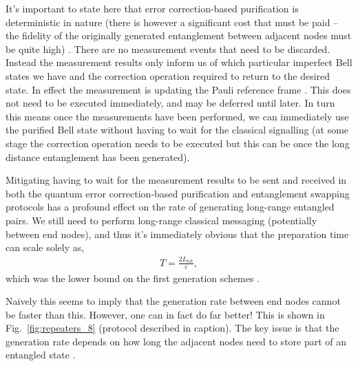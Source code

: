 \documentclass[twocolumn, aps, rmp, amsmath, amssymb, nofootinbib, superscriptaddress, longbibliography, floatfix, table-of-contents, eqsecnum]{revtex4-1}
\begin{document}
It's important to state here that error correction-based purification is deterministic in nature (there is however a significant cost that must be paid -- the fidelity of the originally generated entanglement between adjacent nodes must be quite high) \cite{bib:jiang09, bib:Aschauer2004}. There are no measurement events that need to be discarded. Instead the measurement results only inform us of which particular imperfect Bell states we have and the correction operation required to return to the desired state. In effect the measurement is updating the Pauli reference frame \cite{bib:Knill2005}. This does not need to be executed immediately, and may be deferred until later. In turn this means once the measurements have been performed, we can immediately use the purified Bell state without having to wait for the classical signalling (at some stage the correction operation needs to be executed but this can be once the long distance entanglement has been generated). 

Mitigating having to wait for the measurement results to be sent and received in both the quantum error correction-based purification and entanglement swapping protocols has a profound effect on the rate of generating long-range entangled pairs. We still need to perform long-range classical messaging (potentially between end nodes), and thus it's immediately obvious that the preparation time can scale solely as,
\begin{align}
	T = \frac{2 L_\mathrm{tot}}{c},
\end{align}
which was the lower bound on the first generation schemes \cite{bib:munro10}.

Naively this seems to imply that the generation rate between end nodes cannot be faster than this. However, one can in fact do far better! This is shown in Fig.~\ref{fig:repeaters_8} (protocol described in caption). The key issue is that the generation rate depends on how long the adjacent nodes need to store part of an entangled state \cite{bib:jiang09, bib:munro10, bib:Muralidharan2016}. 
\end{document}
